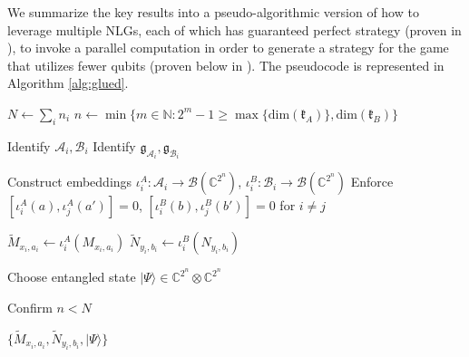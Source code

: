\documentclass{article}
\begin{document}
    We summarize the key results into a pseudo-algorithmic version of how to leverage multiple NLGs, each of which has guaranteed perfect strategy (proven in ), to invoke a parallel computation in order to generate a strategy for the game that utilizes fewer qubits (proven below in ). The pseudocode is represented in Algorithm \ref{alg:glued}.



\begin{algorithm}[h]
    \caption{Game Compression via Commuting Embeddings}
    \label{alg:glued}
    
    $N \gets \sum_i n_i$ 
    $n \gets \min\{m\in\mathbb{N}: 2^m-1\geq \max\{\mathrm{dim}(\mathfrak k_A)\}, \mathrm{dim}(\mathfrak k_B)\}$ 
    
    Identify $\mathcal{A}_i, \mathcal{B}_i$ 
    Identify $\mathfrak{g}_{\mathcal{A}_i}, \mathfrak{g}_{\mathcal{B}_i}$  %
    
    Construct embeddings 
    $\iota^A_i: \mathcal{A}_i \to \mathcal{B}(\mathbb{C}^{2^n})$, 
    $\iota^B_i: \mathcal{B}_i \to \mathcal{B}(\mathbb{C}^{2^n})$ 
    Enforce $[\iota^A_i(a), \iota^A_j(a')] = 0$, $[\iota^B_i(b), \iota^B_j(b')] = 0$ for $i \neq j$ 
    
    $\tilde{M}_{x_i,a_i} \gets \iota^A_i(M_{x_i,a_i})$ 
    $\tilde{N}_{y_i,b_i} \gets \iota^B_i(N_{y_i,b_i})$ 
    
    Choose entangled state $|\Psi\rangle \in \mathbb{C}^{2^{n}} \otimes \mathbb{C}^{2^{n}}$ \; 

    Confirm $n<N$\;
    
    \Return $\{\tilde{M}_{x_i,a_i}, \tilde{N}_{y_i,b_i}, |\Psi\rangle \}$

\end{algorithm}
\end{document}
